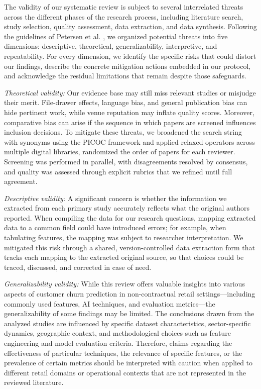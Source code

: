 \documentclass[preprint,12pt]{elsarticle}
\begin{document}
The validity of our systematic review is subject to several interrelated threats across the different phases of the research process, including literature search, study selection, quality assessment, data extraction, and data synthesis. Following the guidelines of Petersen et al. \cite{PETERSEN20151}, we organized potential threats into five dimensions: descriptive, theoretical, generalizability, interpretive, and repeatability. 
For every dimension, we identify the specific risks that could distort our findings, describe the concrete mitigation actions embedded in our protocol, and acknowledge the residual limitations that remain despite those safeguards.

\textit{Theoretical validity: } Our evidence base may still miss relevant studies or misjudge their merit. File-drawer effects, language bias, and general publication bias can hide pertinent work, while venue reputation may inflate quality scores. Moreover, comparative bias can arise if the sequence in which papers are screened influences inclusion decisions. To mitigate these threats, we broadened the search string with synonyms using the PICOC framework and applied relaxed operators across multiple digital libraries, randomized the order of papers for each reviewer. Screening was performed in parallel, with disagreements resolved by consensus, and quality was assessed through explicit rubrics that we refined until full agreement.

\textit{Descriptive validity: }A significant concern is whether the information we extracted from each primary study accurately reflects what the original authors reported. When compiling the data for our research questions, mapping extracted data to a common field could have introduced errors; for example, when tabulating features, the mapping was subject to researcher interpretation. We mitigated this risk through a shared, version-controlled data extraction form that tracks each mapping to the extracted original source, so that choices could be traced, discussed, and corrected in case of need.

\textit{Generalizability validity: } While this review offers valuable insights into various aspects of customer churn prediction in non-contractual retail settings---including commonly used features, AI techniques, and evaluation metrics---the generalizability of some findings may be limited. The conclusions drawn from the analyzed studies are influenced by specific dataset characteristics, sector-specific dynamics, geographic context, and methodological choices such as feature engineering and model evaluation criteria. Therefore, claims regarding the effectiveness of particular techniques, the relevance of specific features, or the prevalence of certain metrics should be interpreted with caution when applied to different retail domains or operational contexts that are not represented in the reviewed literature.
\end{document}
